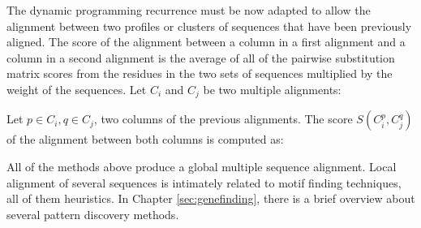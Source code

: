 The dynamic programming recurrence must be now adapted to allow the alignment between 
two profiles or clusters of sequences that have been previously aligned. The score 
of the alignment between a column in a first alignment and a column in a second
alignment is the average of all of the pairwise substitution matrix scores from the 
residues in the two sets of sequences multiplied by the weight of the sequences. 
Let $C_i$ and $C_j$ be two multiple alignments:
\begin{center}
\end{center}

Let $p \in C_i, q \in C_j$, two columns of the previous alignments. The score
$S(C_i^p,C_j^q)$ of the alignment between both columns is computed as:

\begin{center}
\end{center}


All of the methods above produce a global multiple sequence alignment. Local
alignment of several sequences is intimately related to motif finding techniques,
all of them heuristics. In Chapter \ref{sec:genefinding}, there is a brief overview 
about several pattern discovery methods.



